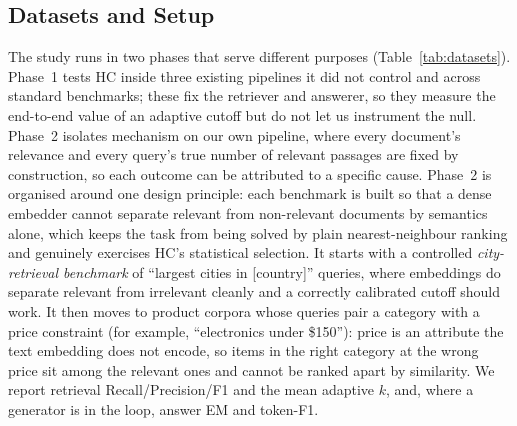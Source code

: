 \documentclass[letterpaper]{article} %
\begin{document}
\subsection{Datasets and Setup}
The study runs in two phases that serve different purposes
(Table~\ref{tab:datasets}). Phase~1 tests HC inside three existing
pipelines it did not control and across standard benchmarks; these fix
the retriever and answerer, so they measure the end-to-end value of an
adaptive cutoff but do not let us instrument the null. Phase~2 isolates
mechanism on our own pipeline, where every document's relevance and every
query's true number of relevant passages are fixed by construction, so
each outcome can be attributed to a specific cause. Phase~2 is organised
around one design principle: each benchmark is built so that a dense
embedder cannot separate relevant from non-relevant documents by
semantics alone, which keeps the task from being solved by plain
nearest-neighbour ranking and genuinely exercises HC's statistical
selection. It starts with a controlled \emph{city-retrieval benchmark} of
``largest cities in [country]'' queries, where embeddings do separate
relevant from irrelevant cleanly and a correctly calibrated cutoff should
work. It then moves to product corpora whose queries pair a category with
a price constraint (for example, ``electronics under \$150''): price is
an attribute the text embedding does not encode, so items in the right
category at the wrong price sit among the relevant ones and cannot be
ranked apart by similarity. We report retrieval Recall/Precision/F1 and
the mean adaptive $k$, and, where a generator is in the loop, answer EM
and token-F1.
\end{document}
